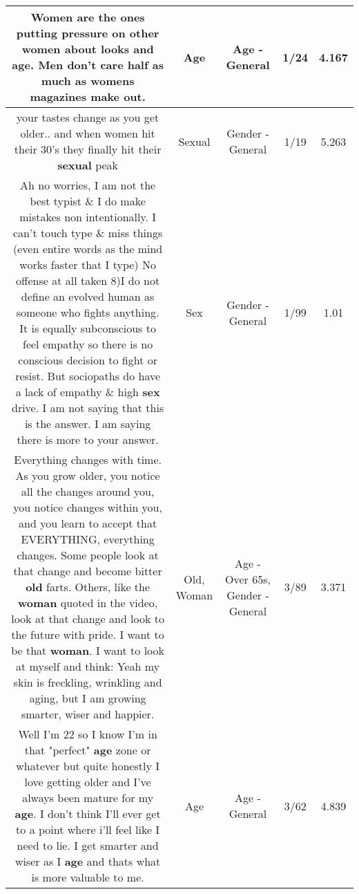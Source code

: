 \documentclass[11pt]{article}
\newlength\mylength
\begin{document}
\begin{center}
\begin{longtable}{|C{.65\mylength}|C{.30\mylength}|C{.12\mylength}|C{.12\mylength}|C{.12\mylength}|}
  \small Women are the ones putting pressure on other women about looks and \textbf{age}. Men don't care half as much as womens magazines make out.\normalsize   & Age & Age - General & 1/24 & 4.167 \\  \hline
  \small your tastes change as you get older.. and when women hit their 30's they finally hit their \textbf{sexual} peak\normalsize   & Sexual & Gender - General & 1/19 & 5.263 \\  \hline
  \small Ah no worries, I am not the best typist \& I do make mistakes non intentionally. I can't touch type \& miss things (even entire words as the mind works faster that I type) No offense at all taken 8)I do not define an evolved human as someone who fights anything. It is equally subconscious to feel empathy so there is no conscious decision to fight or resist. But sociopaths do have a lack of empathy \& high \textbf{sex} drive. I am not saying that this is the answer. I am saying there is more to your answer.\normalsize   & Sex & Gender - General & 1/99 & 1.01 \\  \hline
  \small Everything changes with time. As you grow older, you notice all the changes around you, you notice changes within you, and you learn to accept that EVERYTHING, everything changes. Some people look at that change and become bitter \textbf{old} farts. Others, like the \textbf{woman} quoted in the video, look at that change and look to the future with pride. I want to be that \textbf{woman}. I want to look at myself and think: Yeah my skin is freckling, wrinkling and aging, but I am growing smarter, wiser and happier.\normalsize   & Old, Woman & Age - Over 65s, Gender - General & 3/89 & 3.371 \\  \hline
  \small Well I'm 22 so I know I'm in that "perfect" \textbf{age} zone or whatever but quite honestly I love getting older and I've always been mature for my \textbf{age}.  I don't think I'll ever get to a point where i'll feel like I need to lie. I get smarter and wiser as I \textbf{age} and thats what is more valuable to me.\normalsize   & Age & Age - General & 3/62 & 4.839 \\  \hline

\end{longtable}
\end{center}
\end{document}
